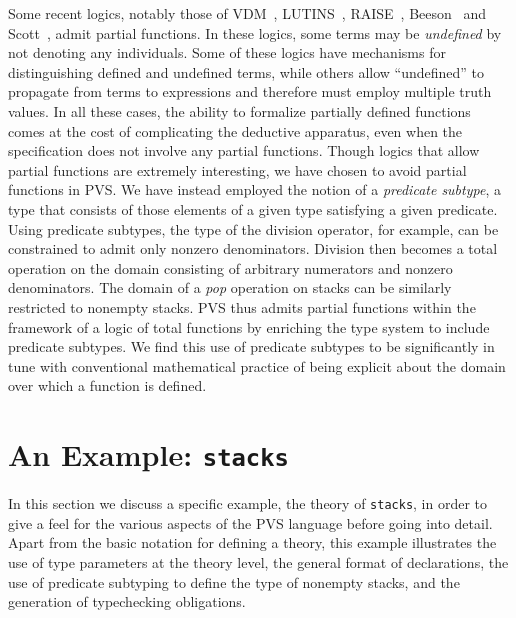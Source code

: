 Some recent logics, notably those of VDM~\cite{Jones:VDM},
LUTINS~\cite{Farmer:functions}, RAISE~\cite{RAISE-tutorial},
Beeson~\cite{Beeson:book} and Scott~\cite{Scott79}, admit partial
functions.  In these logics, some terms may be \emph{undefined} by not
denoting any individuals.  Some of these logics have mechanisms for
distinguishing defined and undefined terms, while others allow
``undefined'' to propagate from terms to expressions and therefore must
employ multiple truth values.  In all these cases, the ability to
formalize partially defined functions comes at the cost of complicating
the deductive apparatus, even when the specification does not involve any
partial functions.  Though logics that allow partial functions are
extremely interesting, we have chosen to avoid partial functions in PVS.
We have instead employed the notion of a \emph{predicate
subtype}, a type that consists of those elements
of a given type satisfying a given predicate.  Using predicate subtypes,
the type of the division operator, for example, can be constrained to
admit only nonzero denominators.  Division then becomes a total operation
on the domain consisting of arbitrary numerators and nonzero denominators.
The domain of a \emph{pop} operation on stacks can be similarly restricted
to nonempty stacks.  PVS thus admits partial functions within the
framework of a logic of total functions by enriching the type system to
include predicate subtypes.  We find this use of predicate subtypes to be
significantly in tune with conventional mathematical practice of being
explicit about the domain over which a function is defined.

\section{An Example: \texttt{stacks}}\label{stacks-example}

In this section we discuss a specific example, the theory of
\texttt{stacks}, in order to give a feel for the various aspects of the
PVS language before going into detail.  Apart from the basic notation for
defining a theory, this example illustrates the use of type parameters at
the theory level, the general format of declarations, the use of predicate
subtyping to define the type of nonempty stacks, and the generation of
typechecking obligations.



